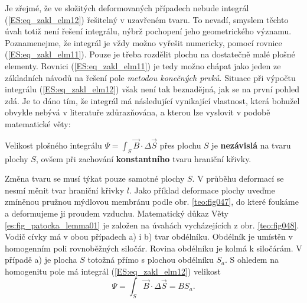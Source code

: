       Je zřejmé, že ve složitých deformovaných případech nebude integrál (\ref{ES:eq_zakl_elm12}) 
      řešitelný v uzavřeném tvaru. To nevadí, smyslem těchto úvah totiž není řešení integrálu, 
      nýbrž pochopení jeho geometrického významu. Poznamenejme, že integrál je vždy možno vyřešit 
      numericky, pomocí rovnice (\ref{ES:eq_zakl_elm11}). Pouze je třeba rozdělit plochu na 
      dostatečně malé plošné elementy. Rovnici (\ref{ES:eq_zakl_elm11}) je tedy možno chápat jako 
      jeden ze základních návodů na řešení pole \emph{metodou konečných prvků}. Situace při výpočtu 
      integrálu (\ref{ES:eq_zakl_elm12}) však není tak beznadějná, jak se na první pohled zdá. Je 
      to dáno tím, že integrál má následující vynikající vlastnost, která bohužel obvykle nebývá v 
      literatuře zdůrazňována, a kterou lze vyslovit v podobě matematické věty:
      \begin{lemma}\label{es:fig_patocka_lemma01}
        Velikost plošného integrálu \(\Psi = \int_S\vec{B}\cdot\Delta \vec{S}\) přes plochu \(S\) 
        je \textbf{nezávislá} na tvaru plochy \(S\), ovšem při zachování \textbf{konstantního} 
        tvaru hraniční křivky.
      \end{lemma}
      
      Změna tvaru se musí týkat pouze samotné plochy \(S\). V průběhu deformací se nesmí měnit tvar 
      hraniční křivky \(l\). Jako příklad deformace plochy uveďme zmíněnou pružnou mýdlovou 
      membránu podle obr. \ref{teo:fig047}, do které foukáme a deformujeme ji 
      proudem vzduchu. Matematický důkaz Věty \ref{es:fig_patocka_lemma01} je založen na úvahách 
      vycházejících z obr. \ref{teo:fig048}. Vodič cívky má v obou případech a) i 
      b) tvar obdélníku. Obdélník je umístěn v homogenním poli rovnoběžných siločár. Rovina 
      obdélníku je kolmá k siločárám. V případě a) je plocha \(S\) totožná přímo s plochou 
      obdélníku \(S_a\). S ohledem na homogenitu pole má integrál (\ref{ES:eq_zakl_elm12}) velikost
      \begin{equation}\label{ES:eq_zakl_elm13}
        \Psi = \int_S\vec{B}\cdot\Delta \vec{S} = BS_a.
      \end{equation}

